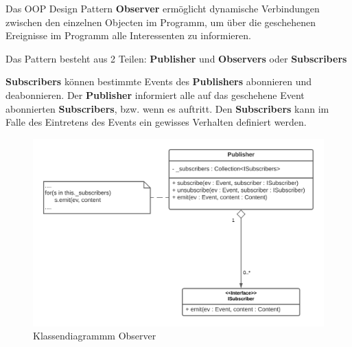 Das OOP Design Pattern \textbf{Observer} ermöglicht dynamische Verbindungen zwischen den einzelnen 
Objecten im Programm, um über die geschehenen Ereignisse im Programm alle Interessenten 
zu informieren.

Das Pattern besteht aus 2 Teilen: \textbf{Publisher} und \textbf{Observers} oder \textbf{Subscribers}

\textbf{Subscribers} können bestimmte Events des \textbf{Publishers} abonnieren und deabonnieren. 
Der \textbf{Publisher} informiert alle auf das geschehene Event abonnierten \textbf{Subscribers}, bzw. wenn es auftritt. 
Den \textbf{Subscribers} kann im Falle des Eintretens des Events ein gewisses Verhalten definiert werden.


\begin{figure}[H]
    \centering
    \includegraphics[width=1\textwidth]{Images/Observer.png}
    \caption[UML Observer]{Klassendiagrammm Observer}
    \label{fig:flow around cylinder}
\end{figure}